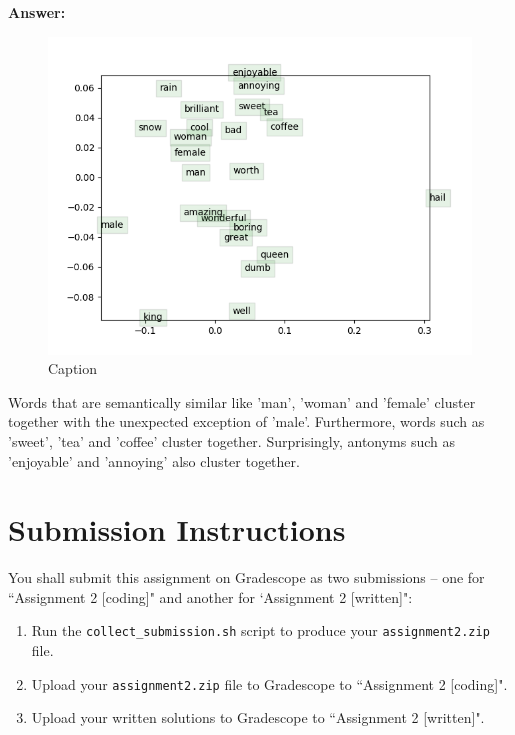 \documentclass{article}
\newenvironment{answer}{
    {\bf Answer:} \sf \begingroup\color{red}
}{\endgroup}%
\begin{document}
\begin{enumerate}[label=(\alph*)]
\begin{shaded}
\begin{answer}
\begin{figure}
    \centering
    \includegraphics{word_vectors.png}
    \caption{Caption}
    \label{fig:my_label}
\end{figure}
Words that are semantically similar like 'man', 'woman' and 'female' cluster together with the unexpected exception of 'male'. Furthermore, words such as 'sweet', 'tea' and 'coffee' cluster together. Surprisingly, antonyms such as 'enjoyable' and 'annoying' also cluster together.
\end{answer}
\end{shaded}

\section{Submission Instructions}
You shall submit this assignment on Gradescope as two submissions -- one for ``Assignment 2 [coding]" and another for `Assignment 2 [written]":
\begin{enumerate}
    \item Run the \texttt{collect\_submission.sh} script to produce your \texttt{assignment2.zip} file.
    \item Upload your \texttt{assignment2.zip} file to Gradescope to ``Assignment 2 [coding]".
    \item Upload your written solutions to Gradescope to ``Assignment 2 [written]".
\end{enumerate}

\end{enumerate}
\end{document}

